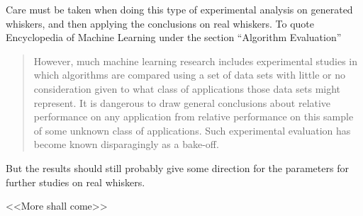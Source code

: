 
Care must be taken when doing this type of experimental analysis on generated whiskers, and then
applying the conclusions on real whiskers. 
To quote Encyclopedia of Machine Learning\cite{EncyclopediaMachineLearning} under the section ``Algorithm Evaluation''
\begin{quote}
    However, much machine learning
    research includes experimental studies in which algorithms 
    are compared using a set of data sets with little
    or no consideration given to what class of applications
    those data sets might represent. It is dangerous to draw
    general conclusions about relative performance on any
    application from relative performance on this sample
    of some unknown class of applications. Such experimental
    evaluation has become known disparagingly as a bake-off.
\end{quote}

But the results should still probably give some direction for the parameters for further studies on real whiskers.

<<More shall come>>




